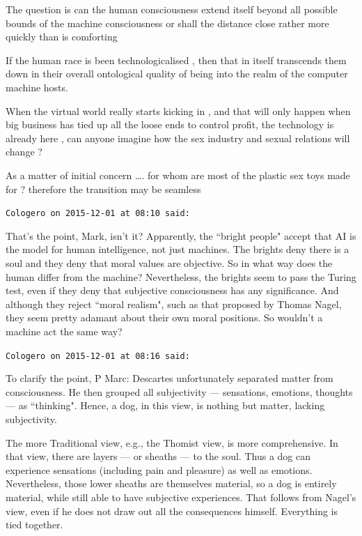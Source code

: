 \begin{footnotesize}
\begin{sffamily}
The question is can the human consciousness extend itself beyond all possible bounds of the machine consciousness or
shall the distance close rather more quickly than is comforting

If the human race is been technologicalised , then that in itself transcends them down in their overall ontological
quality of being into the realm of the computer machine hosts.

When the virtual world really starts kicking in , and that will only happen when big business has tied up all the loose
ends to control profit, the technology is already here , can anyone imagine how the sex industry and sexual relations
will change ?

As a matter of initial concern …. for whom are most of the plastic sex toys made for ? therefore the transition may be
seamless


\hfill

\texttt{Cologero on 2015-12-01 at 08:10 said: }

That's the point, Mark, isn't it? Apparently, the ``bright people" accept that
AI is the model for human intelligence, not just machines. The brights deny there is a soul and they deny that moral
values are objective. So in what way does the human differ from the machine? Nevertheless, the brights seem to pass the
Turing test, even if they deny that subjective consciousness has any significance. And although they reject ``moral
realism", such as that proposed by Thomas Nagel, they seem pretty adamant about their own moral positions. So
wouldn't a machine act the same way?


\hfill

\texttt{Cologero on 2015-12-01 at 08:16 said: }

To clarify the point, P Marc: Descartes unfortunately separated matter from consciousness. He then grouped all
subjectivity — sensations, emotions, thoughts — as ``thinking". Hence, a dog,
in this view, is nothing but matter, lacking subjectivity.

The more Traditional view, e.g., the Thomist view, is more comprehensive. In that view, there are layers
— or sheaths — to the soul. Thus a dog can experience sensations (including
pain and pleasure) as well as emotions. Nevertheless, those lower sheaths are themselves material, so a dog is entirely
material, while still able to have subjective experiences. That follows from Nagel's view, even if
he does not draw out all the consequences himself. Everything is tied together.



\end{sffamily}
\end{footnotesize}
